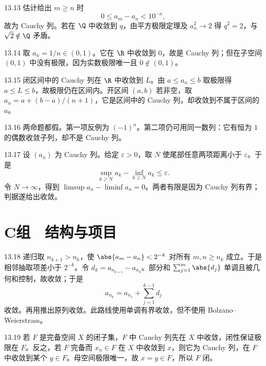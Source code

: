 \begin{solution}{13.13}
估计给出 \(m\ge n\) 时
\[
 0\le a_m-a_n<10^{-n},
\]
故为 Cauchy 列。若在 \(\Q\) 中收敛到 \(q\)，由平方极限定理及
\(a_n^2\to2\) 得 \(q^2=2\)，与 \(\sqrt2\notin\Q\) 矛盾。
\end{solution}

\begin{solution}{13.14}
取 \(a_n=1/n\in(0,1)\)。它在 \(\R\) 中收敛到 \(0\)，故是 Cauchy 列；但在子空间 \((0,1)\) 中没有极限，因为实数极限唯一且 \(0\notin(0,1)\)。
\end{solution}

\begin{solution}{13.15}
闭区间中的 Cauchy 列在 \(\R\) 中收敛到 \(L\)。由
\(a\le a_n\le b\) 取极限得 \(a\le L\le b\)，故极限仍在区间内。开区间 \((a,b)\) 若非空，取
\(a_n=a+(b-a)/(n+1)\)，它是区间中的 Cauchy 列，却收敛到不属于区间的 \(a\)。
\end{solution}

\begin{solution}{13.16}
两命题都假。第一项反例为 \((-1)^n\)。第二项仍可用同一数列：它有恒为 \(1\) 的偶数收敛子列，却不是 Cauchy 列。
\end{solution}

\begin{solution}{13.17}
设 \((a_n)\) 为 Cauchy 列。给定 \(\varepsilon>0\)，取 \(N\) 使尾部任意两项距离小于 \(\varepsilon\)。于是
\[
 \sup_{k\ge N}a_k-\inf_{k\ge N}a_k\le\varepsilon.
\]
令 \(N\to\infty\)，得到
\(\limsup a_n-\liminf a_n=0\)。两者有限是因为 Cauchy 列有界；判据遂给出收敛。
\end{solution}

\section*{C组　结构与项目}

\begin{solution}{13.18}
递归取 \(n_{k+1}>n_k\)，使
\(\abs{a_m-a_n}<2^{-k}\) 对所有 \(m,n\ge n_k\) 成立。于是相邻抽取项差小于 \(2^{-k}\)。令
\(d_k=a_{n_{k+1}}-a_{n_k}\)。部分和
\(\sum_{j=1}^m\abs{d_j}\) 单调且被几何和控制，故收敛；于是
\[
 a_{n_k}=a_{n_1}+\sum_{j=1}^{k-1}d_j
\]
收敛。再用推出原列收敛。此路线使用单调有界收敛，但不使用 Bolzano--Weierstrass。
\end{solution}

\begin{solution}{13.19}
若 \(F\) 是完备空间 \(X\) 的闭子集，\(F\) 中 Cauchy 列先在 \(X\) 中收敛，闭性保证极限在 \(F\)。反之，若 \(F\) 完备而 \(x_n\in F\) 在 \(X\) 中收敛到 \(x\)，则它为 Cauchy 列，在 \(F\) 中收敛到某个 \(y\in F\)。母空间极限唯一，故 \(x=y\in F\)，所以 \(F\) 闭。
\end{solution}

